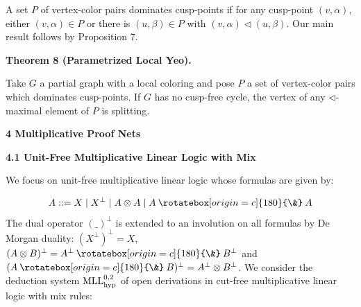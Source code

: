 \documentclass[10pt,a4paper]{amsart}
\providecommand{\invamp}{\mathbin{\rotatebox[origin=c]{180}{\&}}}
\begin{document}
 
 
A set $P$ of vertex-color pairs dominates cusp-points if for any cusp-point $(v,\alpha)$, either $(v,\alpha)\in P$ or there is $(u,\beta)\in P$ with $(v,\alpha)\lhd(u,\beta)$. Our main result follows by Proposition 7.\par
 
 
 
\par\medskip\noindent\textbf{Theorem 8 (Parametrized Local Yeo).}\par
 
 
Take $G$ a partial graph with a local coloring and pose $P$ a set of vertex-color pairs which dominates cusp-points. If $G$ has no cusp-free cycle, the vertex of any $\lhd$-maximal element of $P$ is splitting.\par
 
 
 
 

 
\par\medskip\noindent\textbf{4 Multiplicative Proof Nets}\par
 
 
\par\medskip\noindent\textbf{4.1 Unit-Free Multiplicative Linear Logic with Mix}\par
 
 
We focus on unit-free multiplicative linear logic whose formulas are given by:\par
    \[A::=X\mid X^{\perp}\mid A\otimes A\mid A\invamp A\]    
The dual operator $(\_)^{\perp}$ is extended to an involution on all formulas by De Morgan duality: $(X^{\perp})^{\perp}=X$, $(A\otimes B)^{\perp}=A^{\perp}\invamp B^{\perp}$ and $(A\invamp B)^{\perp}=A^{\perp}\otimes B^{\perp}$. We consider the deduction system $\textnormal{{MLL}}^{0,2}_{\textnormal{{hyp}}}$ of open derivations in cut-free multiplicative linear logic with mix rules:\par
 
 
\end{document}
